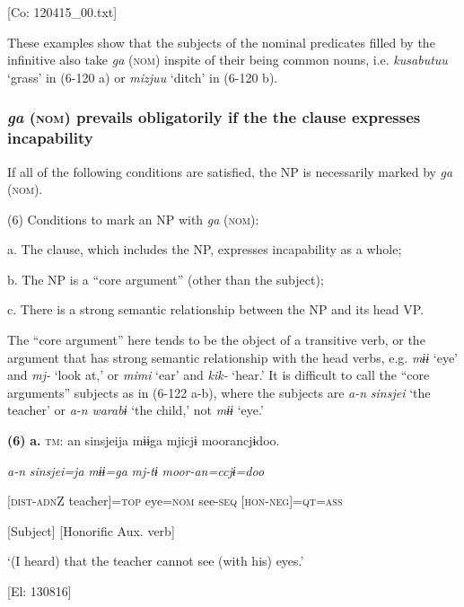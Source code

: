       [Co: 120415\_00.txt]

These examples show that the subjects of the nominal predicates filled by the infinitive also take \textit{ga} (\textsc{nom}) inspite of their being common nouns, i.e. \textit{kusabutuu} ‘grass’ in (6-120 a) or \textit{mizjuu} ‘ditch’ in (6-120 b).

\subsubsection{\textit{ga} (\textsc{nom}) prevails obligatorily if the the clause expresses incapability}

If all of the following conditions are satisfied, the NP is necessarily marked by \textit{ga} (\textsc{nom}).

\begin{styleBeschriftung}
\textmd{(6) Conditions to mark an NP with} \textmd{\textit{ga}}\textmd{ (\textsc{nom}):}
\end{styleBeschriftung}

  a.   The clause, which includes the NP, expresses incapability as a whole;

  b.  The NP is a “core argument” (other than the subject);

  c.  There is a strong semantic relationship between the NP and its head VP.

The “core argument” here tends to be the object of a transitive verb, or the argument that has strong semantic relationship with the head verbs, e.g. \textit{mɨɨ} ‘eye’ and \textit{mj-} ‘look at,’ or \textit{mimi} ‘ear’ and \textit{kik-} ‘hear.’ It is difficult to call the “core arguments” subjects as in (6-122 a-b), where the subjects are \textit{a-n} \textit{sinsjei} ‘the teacher’ or \textit{a-n} \textit{warabɨ} ‘the child,’ not \textit{mɨɨ} ‘eye.’

\textbf{(6)}  \textbf{a.}  \textsc{tm}:  an  sinsjeija  mɨɨga  mjicjɨ  moorancjɨdoo.

      \textit{a-n}  \textit{sinsjei=ja}  \textit{mɨɨ=ga}  \textit{mj-tɨ}  \textit{moor-an=ccjɨ=doo}

      [\textsc{dist}-\textsc{adn}Z  teacher]=\textsc{top}  eye=\textsc{nom}  see-\textsc{seq}  [\textsc{hon}-\textsc{neg}]=\textsc{qt}=\textsc{ass}

      [Subject]      [Honorific Aux. verb]

      ‘(I heard) that the teacher cannot see (with his) eyes.’

      [El: 130816]

